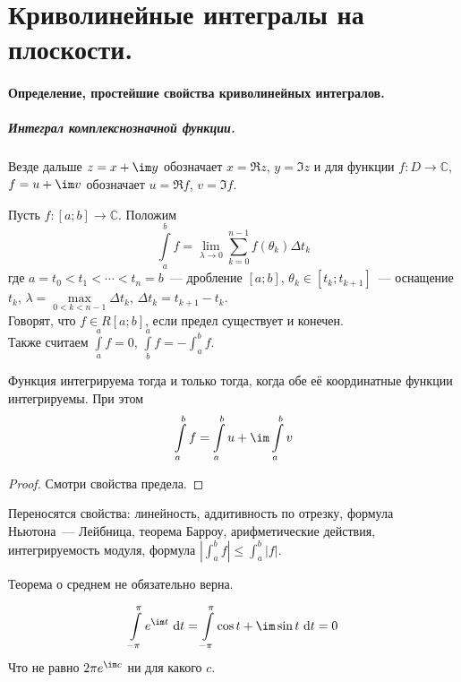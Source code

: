 \documentclass{article}
\begin{document}
    \section{Криволинейные интегралы на плоскости.}
    \paragraph{Определение, простейшие свойства криволинейных интегралов.}
    \subparagraph{Интеграл комплекснозначной функции.}
    \begin{remark}
        Везде дальше $z=x+\im y$ обозначает $x=\Re z$, $y=\Im z$ и для функции $f\colon D\to\mathbb C$, $f=u+\im v$ обозначает $u=\Re f$, $v=\Im f$.
    \end{remark}
    \begin{definition}
        Пусть $f\colon[a;b]\to\mathbb C$. Положим
        $$
        \int\limits_a^bf=\lim\limits_{\lambda\to0}\sum\limits_{k=0}^{n-1}f(\theta_k)\Delta t_k
        $$
        где $a=t_0<t_1<\cdots<t_n=b$~--- дробление $[a;b]$, $\theta_k\in[t_k;t_{k+1}]$~--- оснащение $t_k$, $\lambda=\max\limits_{0<k<n-1}\Delta t_k$, $\Delta t_k=t_{k+1}-t_k$.\\
        Говорят, что $f\in R[a;b]$, если предел существует и конечен.\\
        Также считаем $\int\limits_a^af=0$, $\int\limits_b^af=-\int_a^bf$.
    \end{definition}
    \begin{property}
        Функция интегрируема тогда и только тогда, когда обе её координатные функции интегрируемы. При этом
        $$
        \int\limits_a^bf=\int\limits_a^bu+\im\int\limits_a^bv
        $$
    \end{property}
    \begin{proof}
        Смотри свойства предела.
    \end{proof}
    \begin{property}
        Переносятся свойства: линейность, аддитивность по отрезку, формула Ньютона~--- Лейбница, теорема Барроу, арифметические действия, интегрируемость модуля, формула $|\int\nolimits_a^bf|\leqslant\int\nolimits_a^b|f|$.
    \end{property}
    \begin{property}
        Теорема о среднем не обязательно верна.
    \end{property}
    \begin{example}
        $$
        \int\limits_{-\pi}^\pi e^{\im t}~\mathrm dt=\int\limits_{-\pi}^\pi \cos t+\im\sin t~\mathrm dt=0
        $$
        Что не равно $2\pi e^{\im c}$ ни для какого $c$.
    \end{example}
\end{document}
